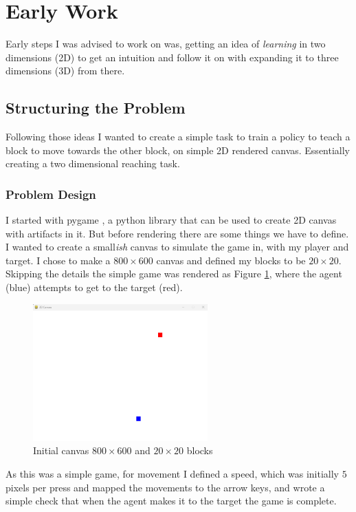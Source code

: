 \section{Early Work}
Early steps I was advised to work on was, getting an idea of \emph{learning} in two dimensions (2D) to get an intuition and follow it on with expanding it to three dimensions (3D) from there.

\subsection{Structuring the Problem}\label{subsec:ew-2d-problem}
Following those ideas I wanted to create a simple task to train a policy to teach a block to move towards the other block, on simple 2D rendered canvas. Essentially creating a two dimensional reaching task.

\subsubsection{Problem Design} 
I started with pygame \cite{pygame}, a python library that can be used to create 2D canvas with artifacts in it. But before rendering there are some things we have to define. I wanted to create a small\emph{ish} canvas to simulate the game in, with my player and target. I chose to make a $800 \times 600$ canvas and defined my blocks to be $20 \times 20$. Skipping the details the simple game was rendered as Figure \ref{fig:initial-canvas}, where the agent (blue) attempts to get to the target (red).

\begin{figure}[h]
  \centering
  \includegraphics[width=0.6\textwidth]{assets/early-work/initial-canvas.png}
  \caption{Initial canvas $800 \times 600$ and $20 \times 20$ blocks}\label{fig:initial-canvas}
\end{figure}

As this was a simple game, for movement I defined a speed, which was initially $5$ pixels per press and mapped the movements to the arrow keys, and wrote a simple check that when the agent makes it to the target the game is complete.

